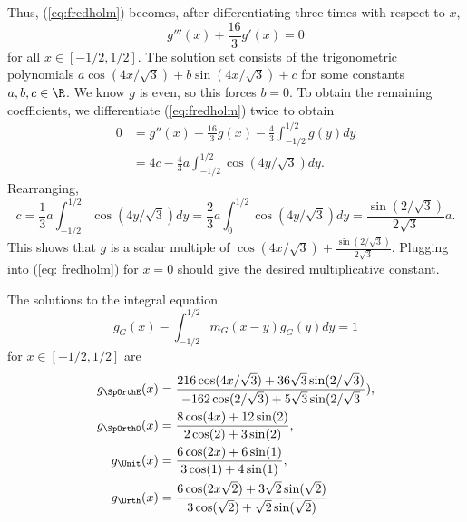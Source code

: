 Thus, (\ref{eq:fredholm}) becomes, after differentiating three times with respect to $x$, 
	\[ g'''(x) + \frac{16}{3} g'(x) = 0 \]
for all $x \in [-1/2, 1/2]$. The solution set consists of the trigonometric polynomials $a \cos(4x/\sqrt 3) + b \sin(4x/\sqrt 3) + c$ for some constants $a, b, c \in \R$. We know $g$ is even, so this forces $b = 0$. To obtain the remaining coefficients, we differentiate (\ref{eq:fredholm}) twice to obtain
	\begin{align*}
		0 
			&= g'' (x) + \frac{16}{3} g(x) - \frac43 \int_{-1/2}^{1/2} g(y) dy \\
			&= 4 c - \frac43  a \int_{-1/2}^{1/2} \cos(4y/\sqrt 3) dy.
	\end{align*}
Rearranging, 
	\[ c = \frac13 a \int_{-1/2}^{1/2} \cos(4y/\sqrt 3) dy = \frac23 a \int_{0}^{1/2} \cos(4y/\sqrt 3) dy = \frac{\sin(2/\sqrt 3)}{2 \sqrt 3} a. \]	
This shows that $g$ is a scalar multiple of $\cos(4x/\sqrt 3) + \frac{\sin(2/\sqrt 3)}{2 \sqrt 3}$. Plugging into (\ref{eq: fredholm}) for $x = 0$ should give the desired multiplicative constant. 

\begin{theorem}
	The solutions to the integral equation
		\[ g_G (x) - \int_{-1/2}^{1/2} m_G (x - y) g_G (y) dy = 1 \]
	for $x \in [-1/2, 1/2]$ are 
		\begin{align*}
			g_{\SpOrthE} (x) 
				&= \frac{216 \cos(4x/\sqrt 3) + 36 \sqrt 3 \sin(2/\sqrt 3)}{-162 \cos(2/\sqrt 3) + 5 \sqrt{3} \sin(2/\sqrt 3}), \\
			g_{\SpOrthO} (x)
				&= \frac{8 \cos (4x) + 12 \sin(2)}{2 \cos (2) + 3 \sin(2)}, \\
			g_{\Unit} (x)
				&= \frac{6 \cos (2x) + 6 \sin(1)}{3 \cos(1) + 4 \sin(1)}, \\
			g_{\Orth} (x)
				&= \frac{6 \cos(2x \sqrt 2) + 3 \sqrt 2 \sin(\sqrt 2)}{3 \cos(\sqrt 2) + \sqrt 2 \sin (\sqrt 2)}			
		\end{align*}	
\end{theorem}